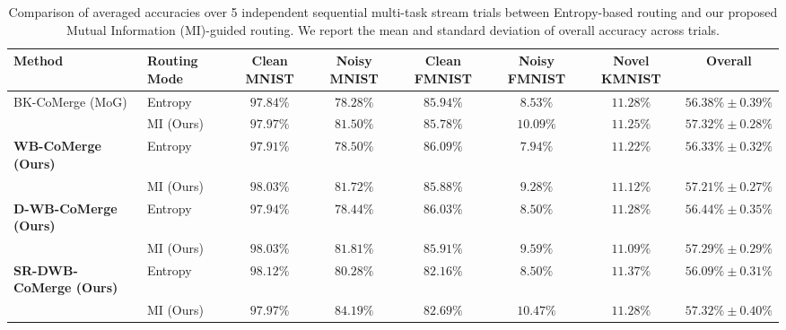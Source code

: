 \documentclass{article}
\theoremstyle{plain}
\theoremstyle{definition}
\theoremstyle{remark}
\begin{document}
\begin{table}[t]
  \caption{Comparison of averaged accuracies over 5 independent sequential multi-task stream trials between Entropy-based routing and our proposed Mutual Information (MI)-guided routing. We report the mean and standard deviation of overall accuracy across trials.}
  \label{tab:routing_comp}
  \vskip 0.1in
  \begin{center}
    \begin{scriptsize}
    \setlength{\tabcolsep}{1.6pt}
      \begin{tabular}{llcccccc}
        \toprule
        Method & Routing Mode & Clean MNIST & Noisy MNIST & Clean FMNIST & Noisy FMNIST & Novel KMNIST & Overall \\
        \midrule
        BK-CoMerge (MoG)               & Entropy    & $97.84\%$ & $78.28\%$ & $85.94\%$ & $8.53\%$ & $11.28\%$ & $56.38\% \pm 0.39\%$ \\
                                       & MI (Ours)  & $97.97\%$ & $81.50\%$ & $85.78\%$ & $10.09\%$ & $11.25\%$ & $57.32\% \pm 0.28\%$ \\
        \midrule
        \textbf{WB-CoMerge (Ours)}     & Entropy    & $97.91\%$ & $78.50\%$ & $86.09\%$ & $7.94\%$ & $11.22\%$ & $56.33\% \pm 0.32\%$ \\
                                       & MI (Ours)  & $98.03\%$ & $81.72\%$ & $85.88\%$ & $9.28\%$ & $11.12\%$ & $57.21\% \pm 0.27\%$ \\
        \midrule
        \textbf{D-WB-CoMerge (Ours)}   & Entropy    & $97.94\%$ & $78.44\%$ & $86.03\%$ & $8.50\%$ & $11.28\%$ & $56.44\% \pm 0.35\%$ \\
                                       & MI (Ours)  & $98.03\%$ & $81.81\%$ & $85.91\%$ & $9.59\%$ & $11.09\%$ & $57.29\% \pm 0.29\%$ \\
        \midrule
        \textbf{SR-DWB-CoMerge (Ours)} & Entropy    & $98.12\%$ & $80.28\%$ & $82.16\%$ & $8.50\%$ & $11.37\%$ & $56.09\% \pm 0.31\%$ \\
                                       & MI (Ours)  & $97.97\%$ & $84.19\%$ & $82.69\%$ & $10.47\%$ & $11.28\%$ & $\mathbf{57.32\% \pm 0.40\%}$ \\
        \bottomrule
      \end{tabular}
    \end{scriptsize}
  \end{center}
  \vskip -0.1in
\end{table}
\end{document}
